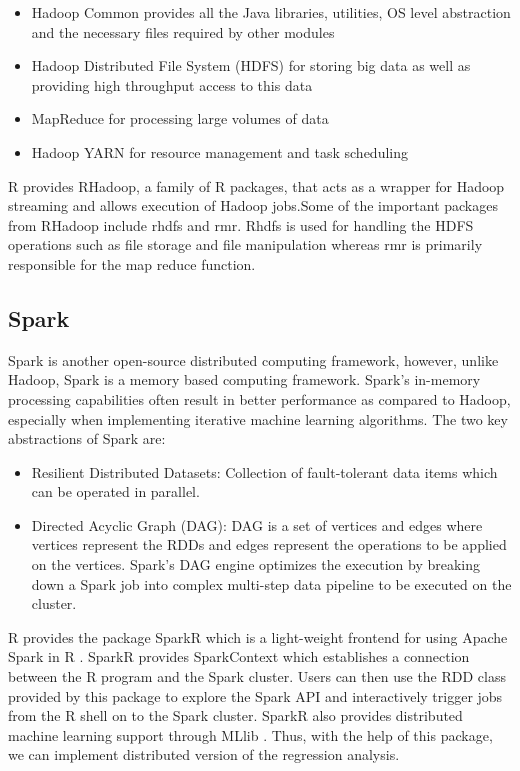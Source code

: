 \documentclass[sigconf]{acmart}
\begin{document}
\begin{itemize}
	\item Hadoop Common provides all the Java libraries, utilities, OS level abstraction and the necessary files required by other modules
	\item Hadoop Distributed File System (HDFS) for storing big data as well as providing high throughput access to this data
	\item MapReduce for processing large volumes of data
	\item Hadoop YARN for resource management and task scheduling
\end{itemize}

R provides RHadoop, a family of R packages, that acts as a wrapper for Hadoop streaming and allows execution of Hadoop jobs.Some of the important packages from RHadoop include rhdfs and rmr. Rhdfs is used for handling the HDFS operations such as file storage and file manipulation whereas rmr is primarily responsible for the map reduce function.

\subsection{Spark} 
Spark is another open-source distributed computing framework, however, unlike Hadoop, Spark is a memory based computing framework. Spark's in-memory processing capabilities often result in better performance as compared to Hadoop, especially when implementing iterative machine learning algorithms. The two key abstractions of Spark are:

\begin{itemize}
	\item Resilient Distributed Datasets: Collection of fault-tolerant data items which can be operated in parallel.
	\item Directed Acyclic Graph (DAG): DAG is a set of vertices and edges where vertices represent the RDDs and edges represent the operations to be applied on the vertices. Spark's DAG engine optimizes the execution by breaking down a Spark job into complex multi-step data pipeline to be executed on the cluster.
\end{itemize}

R provides the package SparkR which is a light-weight frontend for using Apache Spark in R \cite{log-reg}. SparkR provides SparkContext which establishes a connection between the R program and the Spark cluster. Users can then use the RDD class provided by this package to explore the Spark API and interactively trigger jobs from the R shell on to the Spark cluster. SparkR also provides distributed machine learning support through MLlib \cite{log-reg}. Thus, with the help of this package, we can implement distributed version of the regression analysis.
\end{document}
